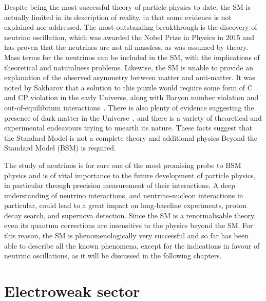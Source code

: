 Despite being the most successful theory of particle physics to date, the SM is actually limited %
in its description of reality, in that some evidence is not explained nor addressed.
The most outstanding breakthrough is the discovery of neutrino oscillation, which was awarded the Nobel Prize in Physics in 2015 %
and has proven that the neutrinos are not all massless, as was assumed by theory.
Mass terms for the neutrinos can be included in the SM, with the implications of theoretical and naturalness problems.
Likewise, the SM is unable to provide an explanation of the observed asymmetry between matter and anti-matter.
It was noted by Sakharov that a solution to this puzzle would require some form of C and CP violation %
in the early Universe, along with Baryon number violation and out-of-equilibrium interactions~\cite{Sakharov:1967dj}.
There is also plenty of evidence suggesting the presence of dark matter %
in the Universe~\cite{Zwicky:1933gu, Rubin:1970zza, Aghanim:2018eyx}, %
and there is a variety of theoretical and experimental endeavours trying to unearth its nature.
These facts suggest that the Standard Model is not a complete theory and additional physics %
Beyond the Standard Model (BSM) is required.

The study of neutrinos is for sure one of the most promising probe to BSM physics and %
is of vital importance to the future development of particle physics, %
in particular through precision measurement of their interactions.
A deep understanding of neutrino interactions, and neutrino-nucleon interactions in particular, %
could lead to a great impact on long-baseline experiments, proton decay search, and supernova detection.
Since the SM is a renormalisable theory, even its quantum corrections are insensitive to the physics beyond the SM.
For this reason, the SM is phenomenologically very successful and so far has been able to describe all the known
phenomena, except for the indications in favour of neutrino oscillations, as it will be discussed in the following chapters.

\section{Electroweak sector}
\label{sec:ew_sector}

